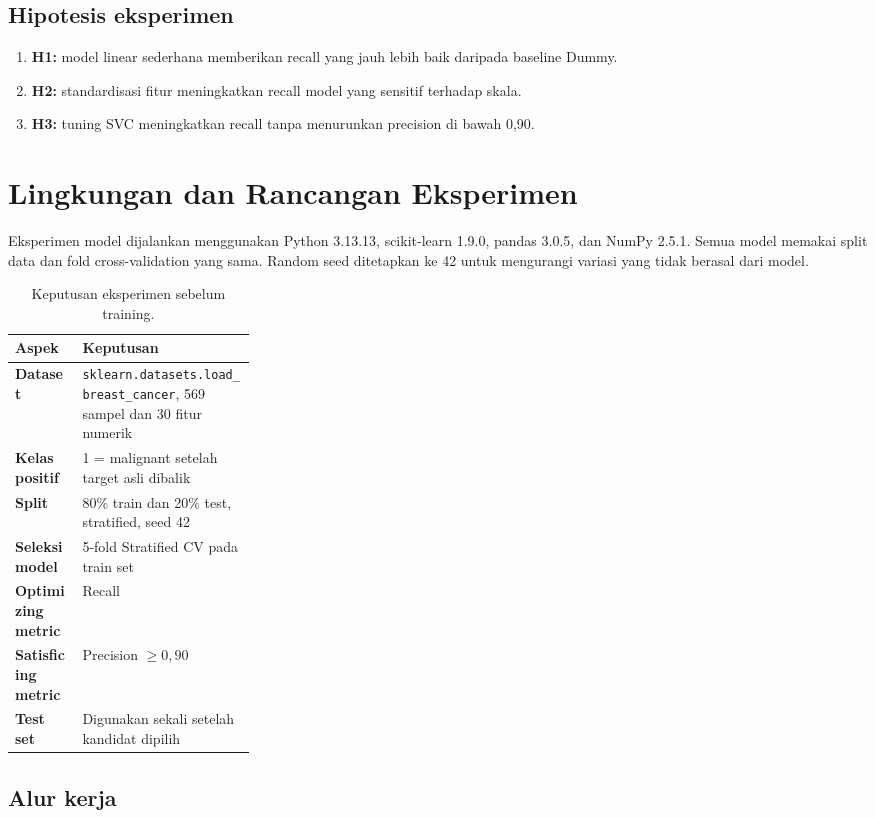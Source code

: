 \documentclass[11pt,a4paper]{article}
\begin{document}
\subsection{Hipotesis eksperimen}

\begin{enumerate}
  \item \textbf{H1:} model linear sederhana memberikan recall yang jauh lebih baik daripada baseline Dummy.
  \item \textbf{H2:} standardisasi fitur meningkatkan recall model yang sensitif terhadap skala.
  \item \textbf{H3:} tuning SVC meningkatkan recall tanpa menurunkan precision di bawah 0,90.
\end{enumerate}

\section{Lingkungan dan Rancangan Eksperimen}

Eksperimen model dijalankan menggunakan Python 3.13.13, scikit-learn 1.9.0, pandas 3.0.5, dan NumPy 2.5.1. Semua model memakai split data dan fold cross-validation yang sama. Random seed ditetapkan ke 42 untuk mengurangi variasi yang tidak berasal dari model.

\begin{table}[ht]
\centering
\caption{Keputusan eksperimen sebelum training.}
\begin{tabularx}{\linewidth}{>{\bfseries}p{0.28\linewidth}X}
\toprule
Aspek & Keputusan \\
\midrule
Dataset & \texttt{sklearn.datasets.load\_breast\_cancer}, 569 sampel dan 30 fitur numerik \\
Kelas positif & 1 = malignant setelah target asli dibalik \\
Split & 80\% train dan 20\% test, stratified, seed 42 \\
Seleksi model & 5-fold Stratified CV pada train set \\
Optimizing metric & Recall \\
Satisficing metric & Precision $\geq 0{,}90$ \\
Test set & Digunakan sekali setelah kandidat dipilih \\
\bottomrule
\end{tabularx}
\end{table}

\subsection{Alur kerja}
\end{document}
